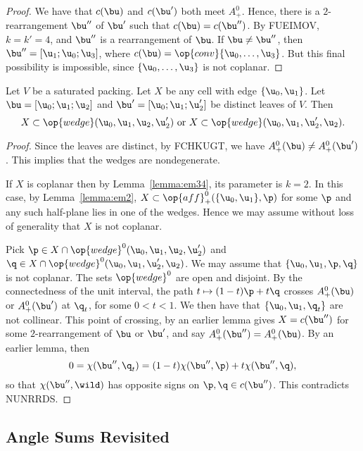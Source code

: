 \begin{proof}  We have that $c(\bu)$ and $c(\bu')$ both meet $A_+^0$.  Hence,
there is a $2$-rearrangement $\bu''$ of $\bu'$ such that $c(\bu) = c(\bu'')$.
By FUEIMOV, $k=k'=4$, and $\bu''$ is a rearrangement of $\bu$.  If $\bu\ne\bu''$,
then $\bu''=[\u_1;\u_0;\u_3]$, where $c(\bu) = \op{conv}\{\u_0,\ldots,\u_3\}$.  But
this final possibility is impossible, since $\{\u_0,\ldots,\u_3\}$ is not coplanar.
\end{proof}

\begin{lemma} Let $V$ be a saturated packing.  Let $X$ be any cell with edge $\{\u_0,\u_1\}$.
Let $\bu=[\u_0;\u_1;\u_2]$ and $\bu'=[\u_0;\u_1;\u_2']$ be distinct leaves of $V$. Then
\[
X \subset \op{wedge}(\u_0,\u_1,\u_2,\u_2') \text{ or } X \subset\op{wedge}(\u_0,\u_1,\u_2',\u_2).
\]
\end{lemma}

\begin{proof}  
Since the leaves are distinct, by FCHKUGT, we have $A_+^0(\bu)\ne A_+^0(\bu')$.
This implies that the wedges are nondegenerate.

If $X$ is coplanar then by Lemma~\ref{lemma:em34}, its parameter is $k=2$.
In this case, by Lemma~\ref{lemma:em2}, $X\subset \op{aff}_+^0(\{\u_0,\u_1\},\p)$ for some $\p$
and any such half-plane lies in one of the wedges.   Hence we may assume without loss of generality
that $X$ is not coplanar.

Pick $\p\in X\cap \op{wedge}^0 (\u_0,\u_1,\u_2,\u_2')$ and $\q\in X\cap \op{wedge}^0(\u_0,\u_1,\u_2',\u_2)$.
We may assume that $\{\u_0,\u_1,\p,\q\}$ is not coplanar.
The sets $\op{wedge}^0$ are open and disjoint.  By the connectedness of the unit interval,
the path $t\mapsto  (1-t) \p + t \q$ crosses $A_+^0(\bu)$ or $A_+^0(\bu')$ at $\q_t$, 
for some $0<t<1$.
We then have that $\{\u_0,\u_1,\q_t\}$ are not collinear.
This point of crossing, by an earlier lemma gives $X=c(\bu'')$ for some $2$-rearrangement of $\bu$ or $\bu'$, and say $A_+^0(\bu'') = A_+^0(\bu)$.
By an earlier lemma, then
\[
0 =\chi(\bu'',\q_t) = (1-t)\chi(\bu'',\p) + t \chi(\bu'',\q),
\]
so that $\chi(\bu'',\wild)$ has opposite signs on $\p,\q\in c(\bu'')$.  This
contradicts NUNRRDS.
\end{proof}

\subsection{Angle Sums Revisited}

